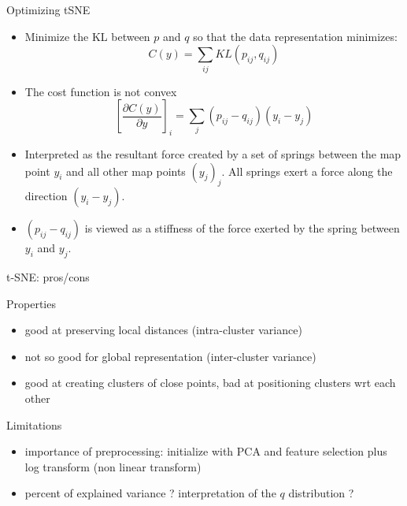 \documentclass{beamer}\usepackage[]{graphicx}\usepackage[]{color}
\begin{document}
\begin{frame}{Optimizing tSNE}
\begin{itemize}
\item Minimize the KL between $p$ and $q$ so that the data representation minimizes:
$$
C(y) = \sum_{ij} KL(p_{ij},q_{ij})
$$
\item The cost function is not convex 
$$
\left[ \frac{\partial C(y)}{\partial y} \right]_i = \sum_{j} (p_{ij}-q_{ij})(y_i - y_j)
$$
\item Interpreted as the resultant force created by a set of springs between the map point $y_i$ and all other map points $\left( y_j \right)_j$. All springs exert a force along the direction $(y_i - y_j)$.
\item $(p_{ij}-q_{ij})$ is viewed as a stiffness of the force exerted by the spring between $y_i$ and $y_j$.
\end{itemize}
\end{frame}


\begin{frame}{t-SNE: pros/cons}

\begin{block}{Properties}
\begin{itemize}
\item good at preserving local distances (intra-cluster variance)
\item not so good for global representation (inter-cluster variance)
\item good at creating clusters of close points, bad at positioning clusters wrt each other
\end{itemize}
\end{block}

\begin{block}{Limitations}
\begin{itemize}
  \item importance of preprocessing: initialize with PCA and feature selection plus log transform (non linear transform)
\item percent of explained variance ? interpretation of the $q$ distribution ?
\end{itemize}
\end{block}

\end{frame}
\end{document}
